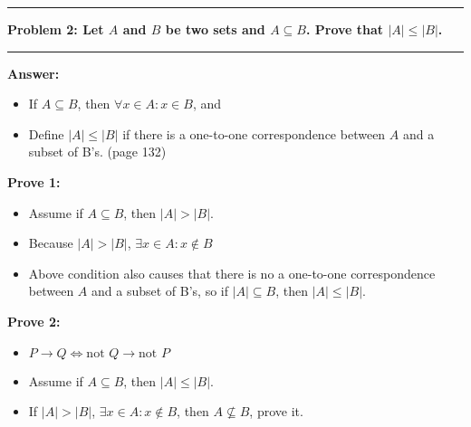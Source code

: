 \documentclass[11pt]{article}
\newcommand\question[2]{\vspace{.25in}\hrule\textbf{#1: #2}\vspace{.5em}\hrule\vspace{.10in}}
\renewcommand\part[1]{\vspace{.10in}\textbf{#1}}
\begin{document}

\question{Problem 2}{Let $A$ and $B$ be two sets and $A \subseteq B$. Prove that $|A| \le |B|$.}

\part{Answer:}

\begin{itemize}
	\item If $A \subseteq B$, then $\forall x \in A: x \in B$, and
	\item Define $|A| \le |B|$ if there is a one-to-one correspondence between $A$ and a subset of B's. (page 132)
\end{itemize}

\part{Prove 1:}

\begin{itemize}
	\item Assume if $A \subseteq B$, then $|A| > |B|$.
	\item Because $|A| > |B|$, $\exists x \in A : x \notin B$
	\item Above condition also causes that there is no a one-to-one correspondence between $A$ and a subset of B's, so if $|A| \subseteq B$, then $|A| \le |B|$.
\end{itemize}

\part{Prove 2:}

\begin{itemize}
	\item $P \rightarrow Q \Leftrightarrow \text{not } Q \rightarrow \text{not } P$ 
	\item Assume if $A \subseteq B$, then $|A| \le |B|$.
	\item If $|A| > |B|$, $\exists x \in A : x \notin B$, then $A \nsubseteq B$, prove it.
\end{itemize}
\end{document}
